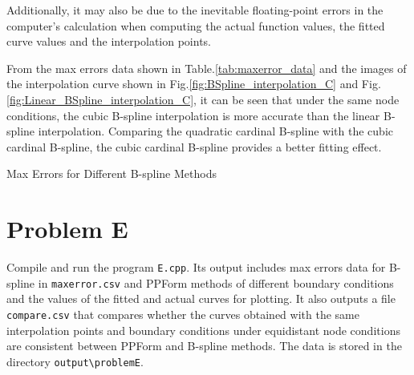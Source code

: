 \documentclass[a4paper]{article}
\begin{document}
\begin{sloppypar}
Additionally, it may also be due to the inevitable floating-point errors in the
computer's calculation when computing the actual function values, the fitted
curve values and the interpolation points.

From the max errors data shown in Table.\ref{tab:maxerror_data} and the images
of the interpolation curve shown in Fig.\ref{fig:BSpline_interpolation_C} and
Fig.\ref{fig:Linear_BSpline_interpolation_C}, it can be seen that under the
same node conditions, the cubic B-spline interpolation is more accurate than
the linear B-spline interpolation. Comparing the quadratic cardinal B-spline
with the cubic cardinal B-spline, the cubic cardinal B-spline provides a better
fitting effect.

\begin{table}[H]
  \centering
  \renewcommand{\tablename}{Table.}
  \caption{Max Errors for Different B-spline Methods}
  \label{tab:maxerror_data}
\end{table}

\section*{Problem E}
Compile and run the program \verb|E.cpp|. Its output includes max errors data for B-spline in \verb|maxerror.csv| and PPForm methods of different boundary conditions and the values of the fitted and actual curves for plotting. It also outputs a file \verb|compare.csv| that compares whether the curves obtained with the same interpolation points and boundary conditions under equidistant node conditions are consistent between PPForm and B-spline methods. The data is stored in the directory \verb|output\problemE|.


\end{sloppypar}
\end{document}
